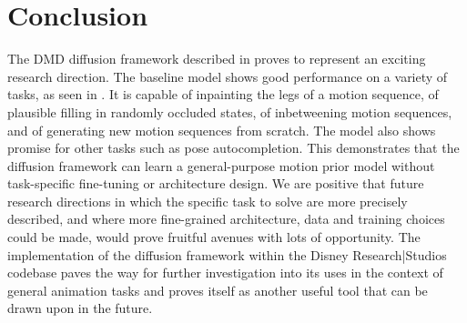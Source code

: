 \section{Conclusion}
\label{sec:diffusion_conclusion}

The DMD diffusion framework described in  proves to represent an exciting research direction. The baseline model shows good performance on a variety of tasks, as seen in . It is capable of inpainting the legs of a motion sequence, of plausible filling in randomly occluded states, of inbetweening motion sequences, and of generating new motion sequences from scratch. The model also shows promise for other tasks such as pose autocompletion. This demonstrates that the diffusion framework can learn a general-purpose motion prior model without task-specific fine-tuning or architecture design. We are positive that future research directions in which the specific task to solve are more precisely described, and where more fine-grained architecture, data and training choices could be made, would prove fruitful avenues with lots of opportunity. The implementation of the diffusion framework within the Disney Research|Studios codebase paves the way for further investigation into its uses in the context of general animation tasks and proves itself as another useful tool that can be drawn upon in the future.